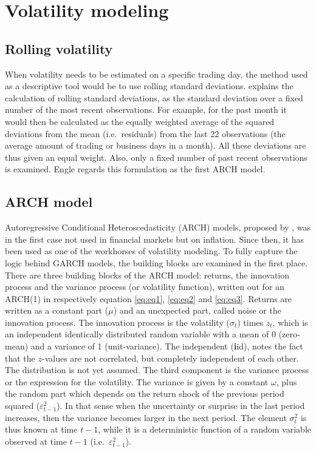 \documentclass[a4paper, twoside]{templates/ociamthesis}
\begin{document}
\newpage

\hypertarget{vol-mod}{%
\section{Volatility modeling}\label{vol-mod}}

\hypertarget{rolling-volatility}{%
\subsection{Rolling volatility}\label{rolling-volatility}}

\noindent When volatility needs to be estimated on a specific trading day, the method used as a descriptive tool would be to use rolling standard deviations. \textcite{engle2001} explains the calculation of rolling standard deviations, as the standard deviation over a fixed number of the most recent observations. For example, for the past month it would then be calculated as the equally weighted average of the squared deviations from the mean (i.e.~residuals) from the last 22 observations (the average amount of trading or business days in a month). All these deviations are thus given an equal weight. Also, only a fixed number of past recent observations is examined. Engle regards this formulation as the first ARCH model.

\hypertarget{arch-model}{%
\subsection{ARCH model}\label{arch-model}}

\noindent Autoregressive Conditional Heteroscedasticity (ARCH) models, proposed by \textcite{engle1982}, was in the first case not used in financial markets but on inflation. Since then, it has been used as one of the workhorses of volatility modeling. To fully capture the logic behind GARCH models, the building blocks are examined in the first place. There are three building blocks of the ARCH model: returns, the innovation process and the variance process (or volatility function), written out for an ARCH(1) in respectively equation \eqref{eq:eq1}, \eqref{eq:eq2} and \eqref{eq:eq3}. Returns are written as a constant part (\(\mu\)) and an unexpected part, called noise or the innovation process. The innovation process is the volatility (\(\sigma_t\)) times \(z_t\), which is an independent identically distributed random variable with a mean of 0 (zero-mean) and a variance of 1 (unit-variance). The independent (\textbf{i}id), notes the fact that the \(z\)-values are not correlated, but completely independent of each other. The distribution is not yet assumed. The third component is the variance process or the expression for the volatility. The variance is given by a constant \(\omega\), plus the random part which depends on the return shock of the previous period squared (\(\varepsilon_{t-1}^2\)). In that sense when the uncertainty or surprise in the last period increases, then the variance becomes larger in the next period. The element \(\sigma_t^2\) is thus known at time \(t-1\), while it is a deterministic function of a random variable observed at time \(t-1\) (i.e.~\(\varepsilon_{t-1}^2\)).
\end{document}
